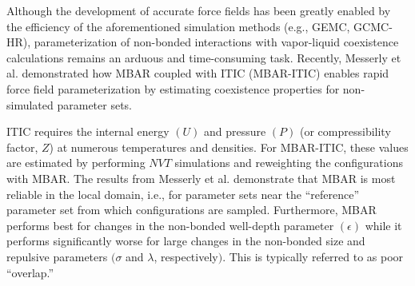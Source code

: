 \documentclass[journal=jced,manuscript=article]{achemso}
\begin{document}


 
Although the development of accurate force fields has been greatly enabled by the efficiency of the aforementioned simulation methods (e.g., GEMC, GCMC-HR), parameterization of non-bonded interactions with vapor-liquid coexistence calculations remains an arduous and time-consuming task. Recently, Messerly et al. demonstrated how MBAR coupled with ITIC (MBAR-ITIC) enables rapid force field parameterization by estimating coexistence properties for non-simulated parameter sets. 

ITIC requires the internal energy $(U)$ and pressure $(P)$ (or compressibility factor, $Z$) at numerous temperatures and densities. For MBAR-ITIC, these values are estimated by performing $NVT$ simulations and reweighting the configurations with MBAR. The results from Messerly et al. demonstrate that MBAR is most reliable in the local domain, i.e., for parameter sets near the ``reference'' parameter set from which configurations are sampled. Furthermore, MBAR performs best for changes in the non-bonded well-depth parameter $(\epsilon)$ while it performs significantly worse for large changes in the non-bonded size and repulsive parameters $(\sigma$ and $\lambda$, respectively$)$. This is typically referred to as poor ``overlap.''
\end{document}
